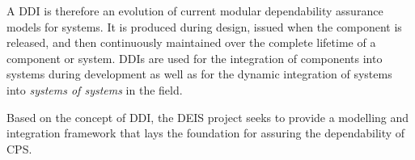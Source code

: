A DDI is therefore an evolution of current modular dependability assurance models for systems. It is produced during design, issued when the component is released, and then continuously maintained over the complete lifetime of a component or system. DDIs are used for the integration of components into systems during development as well as for the dynamic integration of systems into \emph{systems of systems} in the field. 

Based on the concept of DDI, the DEIS project seeks to provide a modelling and integration framework that lays the foundation for assuring the dependability of CPS. 








